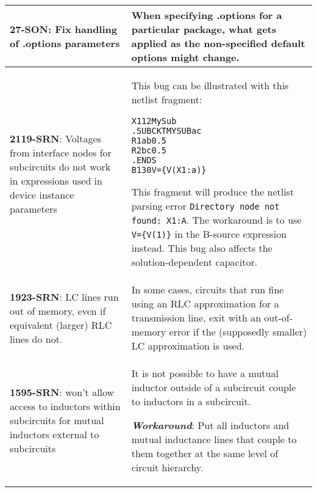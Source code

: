 {\begin{longtable}[h] {>{\raggedright\small}m{2in}|>{\raggedright\let\\\tabularnewline\small}m{3.5in}}
\textbf{27-SON}: Fix handling of .options parameters & When specifying .options
for a particular package, what gets applied as the non-specified
default options might change.  \\ \hline

\textbf{2119-SRN}: Voltages from interface nodes for subcircuits do not 
work in expressions used in device instance parameters & This bug can be
illustrated with this netlist fragment:
\begin{alltt}
X1 1 2 MySub
.SUBCKT MYSUB a c
R1   a b 0.5
R2   b c 0.5
.ENDS
B1 3 0 V=\{V(X1:a)\}
\end{alltt}
This fragment will produce the netlist parsing error \texttt{Directory 
node not found: X1:A}.  The workaround is to use \texttt{V=\{V(1)\}} 
in the B-source expression instead.  This bug also affects the 
solution-dependent capacitor.
\\ \hline

\textbf{1923-SRN}: LC lines run out of memory, even if equivalent (larger) RLC
lines do not. & In some cases, circuits that run fine using an RLC
approximation for a transmission line, exit with an out-of-memory
error if the (supposedly smaller) LC approximation is used.
\\ \hline

\textbf{1595-SRN}: \Xyce{} won't allow access to inductors within subcircuits
for mutual inductors external to subcircuits & It is not possible to
have a mutual inductor outside of a subcircuit couple to inductors in
a subcircuit.

\textbf{\textit{Workaround}}: Put all inductors and mutual inductance lines
that couple to them together at the same level of circuit hierarchy.
\\ \hline

\end{longtable}
}
